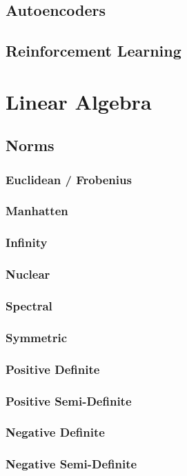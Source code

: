 \documentclass[11pt]{article}
\begin{document}
\subsection{Autoencoders}
\subsection{Reinforcement Learning}

\section{Linear Algebra}
\subsection{Norms}
\subsubsection{Euclidean / Frobenius}
\subsubsection{Manhatten}
\subsubsection{Infinity}
\subsubsection{Nuclear}
\subsubsection{Spectral}
\subsubsection{Symmetric}
\subsubsection{Positive Definite}
\subsubsection{Positive Semi-Definite}
\subsubsection{Negative Definite}
\subsubsection{Negative Semi-Definite}
\end{document}
